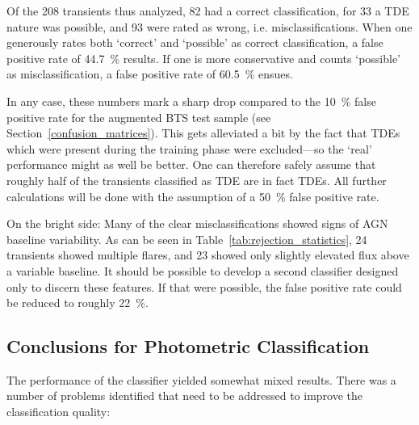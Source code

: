 Of the 208 transients thus analyzed, 82 had a correct classification, for 33 a TDE nature was possible, and 93 were rated as wrong, i.e. misclassifications. When one generously rates both `correct' and `possible' as correct classification, a false positive rate of \SI{44.7}{\percent} results. If one is more conservative and counts `possible' as misclassification, a false positive rate of \SI{60.5}{\percent} ensues.

In any case, these numbers mark a sharp drop compared to the \SI{10}{\percent} false positive rate for the augmented BTS test sample (see Section~\ref{confusion_matrices}). This gets alleviated a bit by the fact that TDEs which were present during the training phase were excluded---so the `real' performance might as well be better. One can therefore safely assume that roughly half of the transients classified as TDE are in fact TDEs. All further calculations will be done with the assumption of a \SI{50}{\percent} false positive rate.

On the bright side: Many of the clear misclassifications showed signs of AGN baseline variability. As can be seen in Table~\ref{tab:rejection_statistics}, 24 transients showed multiple flares, and 23 showed only slightly elevated flux above a variable baseline. It should be possible to develop a second classifier designed only to discern these features. If that were possible, the false positive rate could be reduced to roughly \SI{22}{\percent}.

\subsection{Conclusions for Photometric Classification}
The performance of the classifier yielded somewhat mixed results. There was a number of problems identified that need to be addressed to improve the classification quality:

